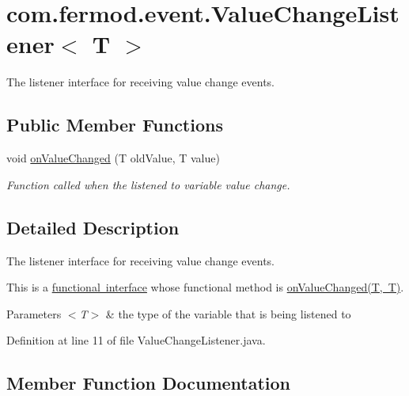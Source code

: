 \hypertarget{a00026}{}\section{com.\+fermod.\+event.\+Value\+Change\+Listener$<$ T $>$}
\label{a00026}


The listener interface for receiving value change events.  


\subsection*{Public Member Functions}
\begin{DoxyCompactItemize}
\item 
void \mbox{\hyperlink{a00026_aa1a058002e2401b5101009155a699482}{on\+Value\+Changed}} (T old\+Value, T value)
\begin{DoxyCompactList}\small\item\em Function called when the listened to variable value change. \end{DoxyCompactList}\end{DoxyCompactItemize}


\subsection{Detailed Description}
The listener interface for receiving value change events. 

This is a \mbox{\hyperlink{}{functional interface}} whose functional method is \mbox{\hyperlink{a00026_aa1a058002e2401b5101009155a699482}{on\+Value\+Changed(\+T, T)}}.


\begin{DoxyParams}{Parameters}
{\em $<$\+T$>$} & the type of the variable that is being listened to \\
\hline
\end{DoxyParams}


Definition at line 11 of file Value\+Change\+Listener.\+java.



\subsection{Member Function Documentation}
\mbox{\label{a00026_aa1a058002e2401b5101009155a699482}} 
